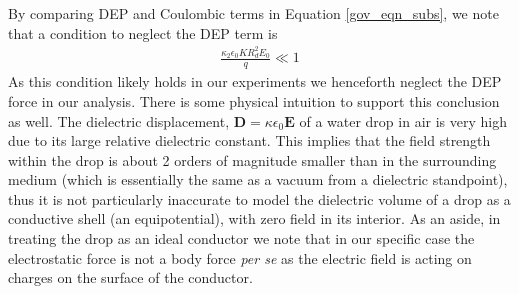 \documentclass[12pt,a4paper,oneside]{book}
\begin{document}
By comparing DEP and Coulombic terms in Equation \ref{gov_eqn_subs}, we note that a condition to neglect the DEP term is
\begin{eqnarray}
\frac{ \kappa_2 \epsilon_0 K R_d^2 E_0}{q} \ll 1 \nonumber
\end{eqnarray}
As this condition likely holds in our experiments we henceforth neglect the DEP force in our analysis. There is some physical intuition to support this conclusion as well. The dielectric displacement, $\mathbf{D} = \kappa \epsilon_0 \mathbf{E}$ of a water drop in air is very high due to its large relative dielectric constant. This implies that the field strength within the drop is about 2 orders of magnitude smaller than in the surrounding medium (which is essentially the same as a vacuum from a dielectric standpoint), thus it is not particularly inaccurate to model the dielectric volume of a drop as a conductive shell (an equipotential), with zero field in its interior. As an aside, in treating the drop as an ideal conductor we note that in our specific case the electrostatic force is not a body force \emph{per se} as the electric field is acting on charges on the surface of the conductor.
\end{document}
